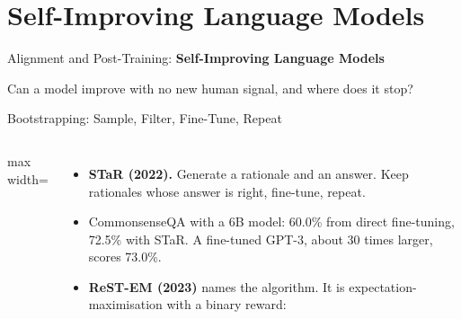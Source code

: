 \section{Self-Improving Language Models}

\begin{frame}{}
    \LARGE Alignment and Post-Training: \textbf{Self-Improving Language Models}

    \vspace{1em}
    \normalsize Can a model improve with no new human signal, and where does it stop?
\end{frame}

\begin{frame}{Bootstrapping: Sample, Filter, Fine-Tune, Repeat}
    \begin{columns}[T,onlytextwidth]
        \centering
        \begin{adjustbox}{max width=\linewidth}\end{adjustbox}
        \begin{itemize}\itemsep0.4em
            \item \textbf{STaR (2022).} Generate a rationale and an answer. Keep rationales whose answer is right, fine-tune, repeat.
            \item CommonsenseQA with a 6B model: 60.0\% from direct fine-tuning, \alert{72.5\%} with STaR. A fine-tuned GPT-3, about 30 times larger, scores 73.0\%.
            \item \textbf{ReST-EM (2023)} names the algorithm. It is expectation-maximisation with a binary reward:
        \end{itemize}

\end{columns}
\end{frame}
